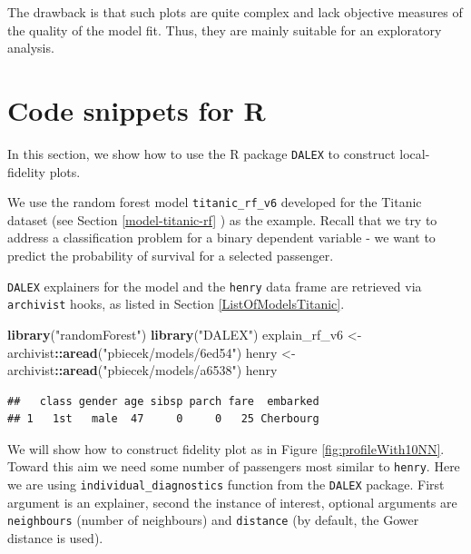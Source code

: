 \documentclass[]{krantz}
\newenvironment{Shaded}{\begin{snugshade}}{\end{snugshade}}
\newcommand{\KeywordTok}[1]{\textcolor[rgb]{0.13,0.29,0.53}{\textbf{#1}}}
\newcommand{\NormalTok}[1]{#1}
\newcommand{\OperatorTok}[1]{\textcolor[rgb]{0.81,0.36,0.00}{\textbf{#1}}}
\newcommand{\StringTok}[1]{\textcolor[rgb]{0.31,0.60,0.02}{#1}}
\begin{document}
The drawback is that such plots are quite complex and lack objective measures of the quality of the model fit. Thus, they are mainly suitable for an exploratory analysis.

\hypertarget{cPLocDiagR}{%
\section{Code snippets for R}\label{cPLocDiagR}}

In this section, we show how to use the R package \texttt{DALEX} \citep{DALEX} to construct local-fidelity plots.

We use the random forest model \texttt{titanic\_rf\_v6} developed for the Titanic dataset (see Section \ref{model-titanic-rf} ) as the example. Recall that we try to address a classification problem for a binary dependent variable - we want to predict the probability of survival for a selected passenger.

\texttt{DALEX} explainers for the model and the \texttt{henry} data frame are retrieved via \texttt{archivist} hooks, as listed in Section \ref{ListOfModelsTitanic}.

\begin{Shaded}
\begin{Highlighting}[]
\KeywordTok{library}\NormalTok{(}\StringTok{"randomForest"}\NormalTok{)}
\KeywordTok{library}\NormalTok{(}\StringTok{"DALEX"}\NormalTok{)}
\NormalTok{explain_rf_v6 <-}\StringTok{ }\NormalTok{archivist}\OperatorTok{::}\KeywordTok{aread}\NormalTok{(}\StringTok{"pbiecek/models/6ed54"}\NormalTok{)}
\NormalTok{henry <-}\StringTok{ }\NormalTok{archivist}\OperatorTok{::}\KeywordTok{aread}\NormalTok{(}\StringTok{"pbiecek/models/a6538"}\NormalTok{)}
\NormalTok{henry}
\end{Highlighting}
\end{Shaded}

\begin{verbatim}
##   class gender age sibsp parch fare  embarked
## 1   1st   male  47     0     0   25 Cherbourg
\end{verbatim}

We will show how to construct fidelity plot as in Figure \ref{fig:profileWith10NN}. Toward this aim we need some number of passengers most similar to \texttt{henry}.
Here we are using \texttt{individual\_diagnostics} function from the \texttt{DALEX} package. First argument is an explainer, second the instance of interest, optional arguments are \texttt{neighbours} (number of neighbours) and \texttt{distance} (by default, the Gower distance is used).
\end{document}
